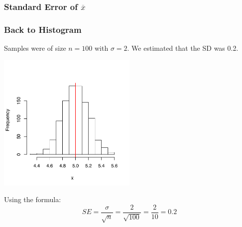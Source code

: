 \documentclass[handout]{beamer}
\newcommand{\blue}[1]{\textcolor{blue2}{#1}}
\newcommand{\xbar}{\overline{x}}
\begin{document}
\begin{frame}[fragile]
\frametitle{Standard Error of $\xbar$}

%
%
%
%

\end{frame}


\begin{frame}[fragile]
\frametitle{Back to Histogram}
Samples were of size $n=100$ with $\sigma=2$.  We estimated that the SD was 0.2. 
\begin{center}
\includegraphics[width=0.5\textwidth]{figure/lec12-001}
\end{center}

\pause Using the formula:
\[
SE = \frac{\sigma}{\sqrt{n}} = \frac{2}{\sqrt{100}} = \frac{2}{10} = 0.2
\]

\end{frame}
\end{document}
